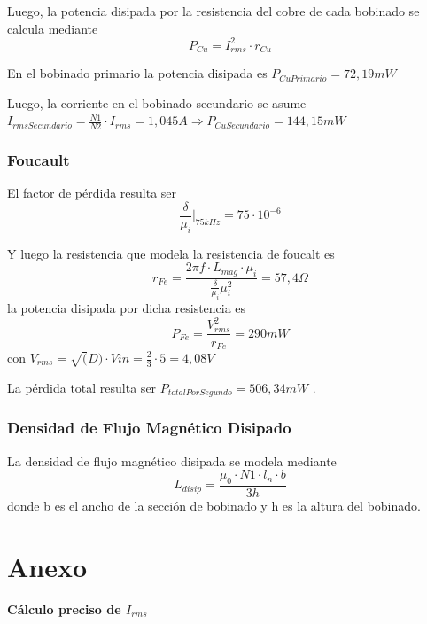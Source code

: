 \documentclass{article}
\begin{document}
Luego, la potencia disipada por la resistencia del cobre de cada bobinado se calcula mediante
\begin{equation*}
    P_{Cu} = I_{rms}^2 \cdot r_{Cu}
\end{equation*}

En el bobinado primario la potencia disipada es $ P_{CuPrimario} = 72,19 mW $

Luego, la corriente en el bobinado secundario se asume $ I_{rmsSecundario} = \frac{N1}{N2} \cdot I_{rms} = 1,045 A  \Rightarrow P_{CuSecundario} = 144,15 mW $

\subsubsection{Foucault}
El factor de pérdida resulta ser
\begin{equation*}
    \frac{\delta}{\mu_i} \Big|_{75kHz} = 75 \cdot 10^{-6}
\end{equation*}

Y luego la resistencia que modela la resistencia de foucalt es
\begin{equation*}
    r_{Fe} = \frac{2\pi f \cdot L_{mag} \cdot \mu_i}{\frac{\delta}{\mu_i} \mu_i^2} = 57,4 \Omega
\end{equation*}
la potencia disipada por dicha resistencia es 
\begin{equation*}
    P_{Fe} = \frac{V_{rms}^2}{r_{Fe}} =  290 mW
\end{equation*}
con $ V_{rms} = \sqrt(D) \cdot Vin  = \frac{2}{3} \cdot 5 = 4,08 V $

\vspace{5mm}
La pérdida total resulta ser $ P_{totalPorSegundo} = 506,34 mW $ .

\subsubsection{Densidad de Flujo Magnético Disipado}
La densidad de flujo magnético disipada se modela mediante
\begin{equation*}
    L_{disip} = \frac{\mu_0 \cdot N1 \cdot l_n \cdot b }{3h}
\end{equation*}
donde b es el ancho de la sección de bobinado y h es la altura del bobinado.


\section{Anexo}
\textbf{Cálculo preciso de $ I_{rms} $}
\label{IrmsPreciso}
\end{document}
